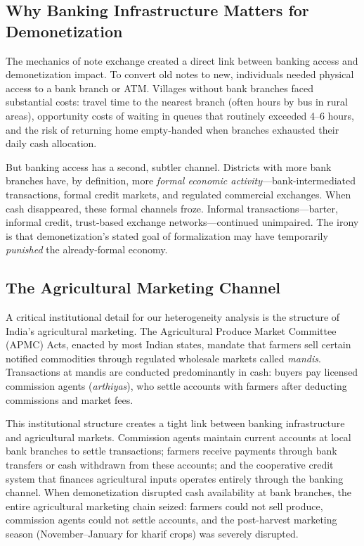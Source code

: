 \documentclass[12pt]{article}
\begin{document}
\subsection{Why Banking Infrastructure Matters for Demonetization}

The mechanics of note exchange created a direct link between banking access and demonetization impact. To convert old notes to new, individuals needed physical access to a bank branch or ATM. Villages without bank branches faced substantial costs: travel time to the nearest branch (often hours by bus in rural areas), opportunity costs of waiting in queues that routinely exceeded 4--6 hours, and the risk of returning home empty-handed when branches exhausted their daily cash allocation.

But banking access has a second, subtler channel. Districts with more bank branches have, by definition, more \textit{formal economic activity}---bank-intermediated transactions, formal credit markets, and regulated commercial exchanges. When cash disappeared, these formal channels froze. Informal transactions---barter, informal credit, trust-based exchange networks---continued unimpaired. The irony is that demonetization's stated goal of formalization may have temporarily \textit{punished} the already-formal economy.

\subsection{The Agricultural Marketing Channel}

A critical institutional detail for our heterogeneity analysis is the structure of India's agricultural marketing. The Agricultural Produce Market Committee (APMC) Acts, enacted by most Indian states, mandate that farmers sell certain notified commodities through regulated wholesale markets called \textit{mandis}. Transactions at mandis are conducted predominantly in cash: buyers pay licensed commission agents (\textit{arthiyas}), who settle accounts with farmers after deducting commissions and market fees.

This institutional structure creates a tight link between banking infrastructure and agricultural markets. Commission agents maintain current accounts at local bank branches to settle transactions; farmers receive payments through bank transfers or cash withdrawn from these accounts; and the cooperative credit system that finances agricultural inputs operates entirely through the banking channel. When demonetization disrupted cash availability at bank branches, the entire agricultural marketing chain seized: farmers could not sell produce, commission agents could not settle accounts, and the post-harvest marketing season (November--January for kharif crops) was severely disrupted.
\end{document}
